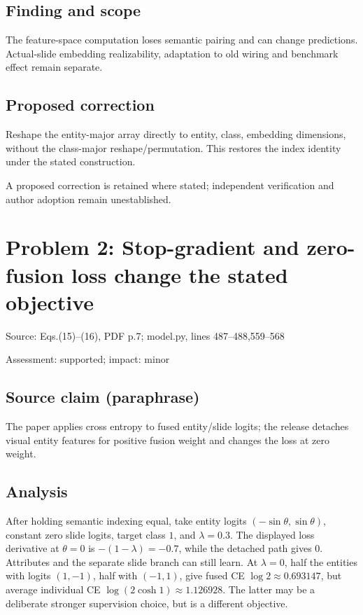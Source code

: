 \documentclass[11pt]{article}
\begin{document}
\subsection*{Finding and scope}

The feature-space computation loses semantic pairing and can change predictions. Actual-slide embedding realizability, adaptation to old wiring and benchmark effect remain separate.

\subsection*{Proposed correction}

Reshape the entity-major array directly to entity, class, embedding dimensions, without the class-major reshape/permutation. This restores the index identity under the stated construction.

A proposed correction is retained where stated; independent verification and author adoption remain unestablished.

\section*{Problem 2: Stop-gradient and zero-fusion loss change the stated objective}

Source: Eqs.(15)–(16), PDF p.7; model.py, lines 487–488,559–568

Assessment: supported; impact: minor

\subsection*{Source claim (paraphrase)}

The paper applies cross entropy to fused entity/slide logits; the release detaches visual entity features for positive fusion weight and changes the loss at zero weight.

\subsection*{Analysis}

After holding semantic indexing equal, take entity logits \((-\sin\theta,\sin\theta)\), constant zero slide logits, target class \(1\), and \(\lambda=0.3\). The displayed loss derivative at \(\theta=0\) is \(-(1-\lambda)=-0.7\), while the detached path gives \(0\). Attributes and the separate slide branch can still learn. At \(\lambda=0\), half the entities with logits \((1,-1)\), half with \((-1,1)\), give fused CE \(\log2\approx0.693147\), but average individual CE \(\log(2\cosh1)\approx1.126928\). The latter may be a deliberate stronger supervision choice, but is a different objective.
\end{document}
